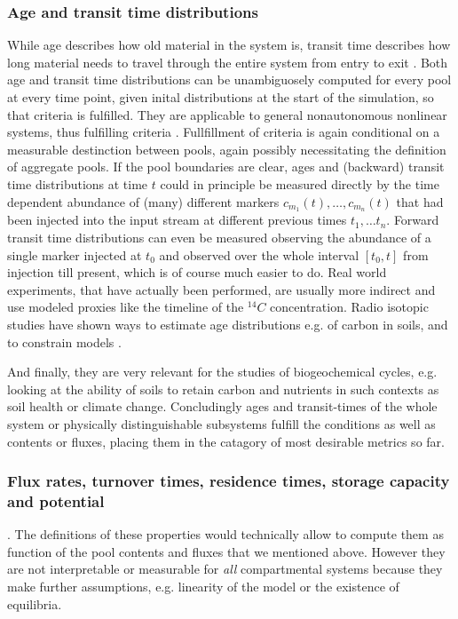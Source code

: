 \subsubsection{Age and transit time distributions}
While age describes how old material in the system is, transit time describes how
long material needs to travel through the entire system from entry to exit
\cite{bolin1973Tellus, Sierra2017GCB}.
Both age and transit time distributions can be unambiguosely computed for every pool at every time point, given inital distributions at the start of the simulation, so that criteria  is fulfilled.
They are applicable to general nonautonomous nonlinear systems, thus fulfilling criteria .
Fullfillment of criteria  is again conditional on a measurable destinction between pools, again possibly necessitating the definition of aggregate pools.
If the pool boundaries are clear, ages and (backward) transit time
distributions at time $t$ could in principle be measured directly by the time
dependent abundance of (many) different markers $c_{m_1}(t),\dots, c_{m_n}(t)$ that
had been injected into the input stream at different previous times $t_1,\dots
t_n$. Forward transit time distributions can even be measured observing the
abundance of a single marker injected at $t_0$ and observed over the whole interval $[t_0,t]$ from injection till present, which is of course much easier to do.
Real world experiments, that have actually been performed, are usually more indirect and use modeled proxies like the timeline of the $^{14}C$ concentration.
Radio isotopic studies have shown ways to estimate 
age distributions e.g. of carbon in soils, and to constrain models
\cite{Trumbore2016, shi_age_2020}.

And finally, they are very relevant for the studies of biogeochemical cycles, e.g. looking at the ability of soils to retain carbon and nutrients in such contexts as soil health or climate change. 
Concludingly ages and transit-times of the whole system or physically distinguishable subsystems fulfill the conditions as well as contents or fluxes, placing them in the catagory of most desirable metrics so far.
\subsubsection{Flux rates, turnover times, residence times, storage capacity and potential}.
The definitions of these properties would technically allow to compute them as function of the pool contents and fluxes that 
we mentioned above.
However they are not interpretable or measurable for \emph{all} compartmental systems because they make further assumptions, e.g. linearity of the model or the existence of equilibria. 

